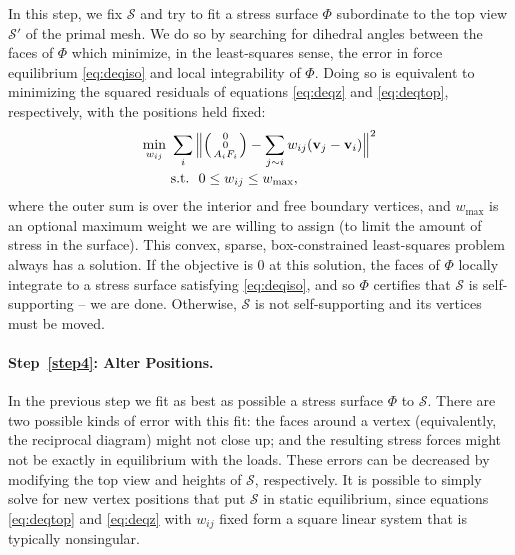 \documentclass[annual]{acmsiggraph}
\makeatletter
\def\Forcevector{\Big(\mbox{\scriptsize
	\def\arraystretch{0.8}\begin{tabular}{@{\,}c@{\,}}
	0 \\ 0 \\ $A_i F_i$
	\end{tabular}}\Big)}
\def\SS{{\mathcal S}}
\makeatother
\begin{document}
In this step, we fix $\SS$ and try to
fit a stress surface $\Phi$ subordinate to the top view $\SS'$ of the
primal mesh. We do so by searching for dihedral angles between the faces of $\Phi$
which minimize, in the least-squares sense, the error in force equilibrium
\eqref{eq:deqiso} and local integrability of $\Phi$. Doing so is
equivalent to minimizing the squared residuals of equations
\eqref{eq:deqz} and \eqref{eq:deqtop}, respectively, with the positions
held fixed:
	\begin{align}
	\min_{w_{ij}}\
	&
	\sum_i
	\Big\| \Forcevector -
		\sum_{j\sim i} w_{ij} (\vw_j-\vw_i) \Big\|^2
		\nonumber
	\\&
	\textrm{s.t.}\ \
		0 \leq w_{ij} \leq w_{\max}, \label{eq:wbounds}
\end{align}
 where the outer sum is over the interior and free boundary vertices, and
$w_\textrm{max}$ is an optional maximum weight we are willing to assign
(to limit the amount of stress in the surface). This convex, sparse,
box-constrained least-squares problem \cite{BCLS}always has a solution. If the
objective is $0$ at this solution, the faces of $\Phi$ locally integrate
to a stress surface satisfying \eqref{eq:deqiso}, and so $\Phi$ certifies
that $\SS$ is self-supporting -- we are done. Otherwise, $\SS$ is not
self-supporting and its vertices must be moved.

\paragraph{Step~\ref{step4}: Alter Positions.} In the previous step we fit as best as
possible a stress surface $\Phi$ to $\SS$. There are two possible kinds of
error with this fit: the faces around a vertex (equivalently, the
reciprocal diagram) might not close up; and the resulting stress forces
might not be exactly in equilibrium with the loads. These errors can be
decreased by modifying the top view and heights of $\SS$, respectively. It
is possible to simply solve for new vertex positions that put $\SS$ in
static equilibrium, since equations \eqref{eq:deqtop} and \eqref{eq:deqz}
with $w_{ij}$ fixed form a square linear system that is typically
nonsingular.
\end{document}
